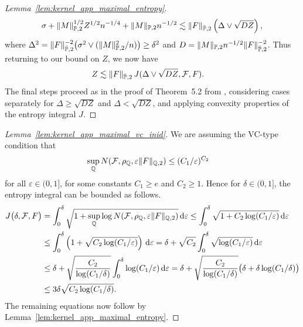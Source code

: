 \begin{proof}[Lemma~\ref{lem:kernel_app_maximal_entropy}]
\begin{align*}
    \sigma
    +
    \|M\|_{\P,2}^{1/2} Z^{1/2} n^{-1/4}
    +
    \|M\|_{\P,2} n^{-1/2}
    \lesssim
    \|F\|_{\bar\P,2}
    \left( \Delta \vee \sqrt{DZ} \right),
  \end{align*}
  where
  $\Delta^2 = \|F\|_{\bar\P,2}^{-2}
  \big(\sigma^2 \vee (\|M\|_{\P,2}^2 / n) \big) \geq \delta^2$
  and
  $D = \|M\|_{\P,2} n^{-1/2} \|F\|_{\bar\P,2}^{-2}$.
  Thus returning to our bound on $Z$,
  we now have
  \begin{align*}
    Z
    &\lesssim
    \|F\|_{\bar\P,2}
    \, J(\Delta \vee \sqrt{DZ}, \cF, F).
  \end{align*}
  The final steps proceed as
  in the proof of Theorem~5.2
  from \citet{chernozhukov2014gaussian},
  considering cases separately for
  $\Delta \geq \sqrt{DZ}$
  and
  $\Delta < \sqrt{DZ}$,
  and applying convexity properties of
  the entropy integral $J$.
\end{proof}

\begin{proof}[Lemma~\ref{lem:kernel_app_maximal_vc_inid}]

  We are assuming the VC-type condition that
  \begin{align*}
    \sup_\Q N(\cF, \rho_\Q, \varepsilon \|F\|_{\Q,2})
    &\leq
    (C_1/\varepsilon)^{C_2}
  \end{align*}
  for all $\varepsilon \in (0,1]$,
  for some constants
  $C_1 \geq e$
  and $C_2 \geq 1$.
  Hence for $\delta \in (0,1]$,
  the entropy integral can be bounded as follows.
  \begin{align*}
    J\big(\delta, \cF, F\big)
    &=
    \int_0^\delta
    \sqrt{1 +
    \sup_\Q \log N(\cF, \rho_\Q, \varepsilon \|F\|_{\Q,2})}
    \diff{\varepsilon}
    \leq
    \int_0^\delta
    \sqrt{1 +
    C_2 \log (C_1/\varepsilon)}
    \diff{\varepsilon} \\
    &\leq
    \int_0^\delta
    \left(
      1 +
      \sqrt{C_2 \log (C_1/\varepsilon)}
    \right)
    \diff{\varepsilon}
    =
    \delta
    + \sqrt{C_2}
    \int_0^\delta
    \sqrt{\log (C_1/\varepsilon)}
    \diff{\varepsilon} \\
    &\leq
    \delta
    + \sqrt{\frac{C_2}{\log (C_1/\delta)}}
    \int_0^\delta
    \log (C_1/\varepsilon)
    \diff{\varepsilon}
    =
    \delta
    + \sqrt{\frac{C_2}{\log (C_1/\delta)}}
    \big(
      \delta
      + \delta \log (C_1/\delta)
    \big) \\
    &\leq
    3 \delta
    \sqrt{C_2 \log (C_1/\delta)}.
  \end{align*}
  The remaining equations now follow
  by Lemma~\ref{lem:kernel_app_maximal_entropy}.
\end{proof}

